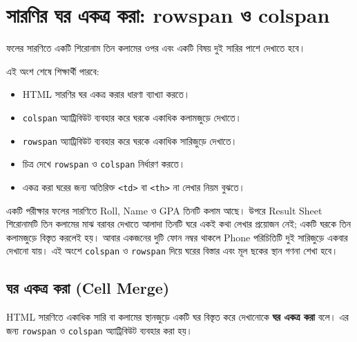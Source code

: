 \section{সারণির ঘর একত্র করা: rowspan ও colspan}

ফলের সারণিতে একটি শিরোনাম তিন কলামের ওপর এবং একটি বিষয় দুই সারির পাশে দেখাতে হবে।



\begin{learningbox}
এই অংশ শেষে শিক্ষার্থী পারবে:
\begin{itemize}
\item HTML সারণির ঘর একত্র করার ধারণা ব্যাখ্যা করতে।
\item \texttt{colspan} অ্যাট্রিবিউট ব্যবহার করে ঘরকে একাধিক কলামজুড়ে দেখাতে।
\item \texttt{rowspan} অ্যাট্রিবিউট ব্যবহার করে ঘরকে একাধিক সারিজুড়ে দেখাতে।
\item চিত্র দেখে \texttt{rowspan} ও \texttt{colspan} নির্ধারণ করতে।
\item একত্র করা ঘরের জন্য অতিরিক্ত \texttt{<td>} বা \texttt{<th>} না লেখার নিয়ম বুঝতে।
\end{itemize}
\end{learningbox}



একটি পরীক্ষার ফলের সারণিতে Roll, Name ও GPA তিনটি কলাম আছে। উপরে Result Sheet শিরোনামটি তিন কলামের মাঝ বরাবর দেখাতে আলাদা তিনটি ঘরে একই কথা লেখার প্রয়োজন নেই; একটি ঘরকে তিন কলামজুড়ে বিস্তৃত করলেই হয়। আবার একজনের দুটি ফোন নম্বর থাকলে Phone পরিচিতিটি দুই সারিজুড়ে একবার দেখানো যায়। এই অংশে \texttt{colspan} ও \texttt{rowspan} দিয়ে ঘরের বিস্তার এবং মূল ছকের স্থান গণনা শেখা হবে।

\subsection{ঘর একত্র করা (Cell Merge)}

\begin{definitionbox}{}
HTML সারণিতে একাধিক সারি বা কলামের স্থানজুড়ে একটি ঘর বিস্তৃত করে দেখানোকে \textbf{ঘর একত্র করা} বলে। এর জন্য \texttt{rowspan} ও \texttt{colspan} অ্যাট্রিবিউট ব্যবহার করা হয়।
\end{definitionbox}

